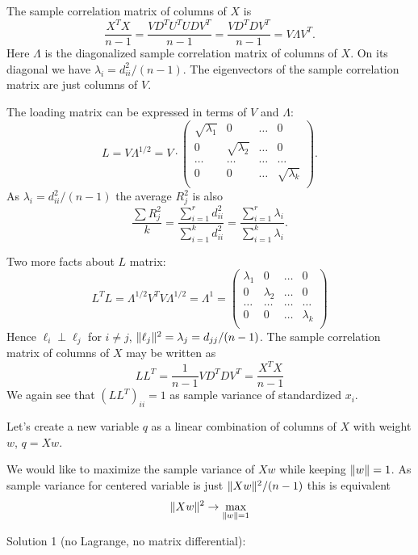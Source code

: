 \documentclass[12pt]{article}
\DeclarePairedDelimiter{\norm}{\lVert}{\rVert}
\begin{document}
The sample correlation matrix of columns of $X$ is
\[
\frac{X^T X}{n-1} = \frac{V D^T U^T UDV^T}{n - 1} = \frac{V D^T D V^T}{ n - 1} = V \Lambda V^T.
\]
Here $\Lambda$ is the diagonalized sample correlation matrix of columns of $X$.
On its diagonal we have $\lambda_i = d_{ii}^2 / (n - 1)$.
The eigenvectors of the sample correlation matrix are just columns of $V$. 

The loading matrix can be expressed in terms of $V$ and $\Lambda$:
\[
L = V \Lambda^{1/2} = V \cdot \begin{pmatrix}
    \sqrt{\lambda_1 } & 0 & \dots & 0 \\
    0  & \sqrt{\lambda_2} & \dots & 0 \\
    \dots & \dots & \dots & \dots \\
    0 & 0 & \dots & \sqrt{\lambda_k} \\
\end{pmatrix}.
\]
As $\lambda_i = d_{ii}^2 / (n-1)$ the average $R^2_j$ is also 
\[
\frac{\sum R_j^2}{k} =  \frac{\sum_{i=1}^r d_{ii}^2}{\sum_{i=1}^k d_{ii}^2} =  \frac{\sum_{i=1}^r \lambda_i}{\sum_{i=1}^k \lambda_i} .
\]

Two more facts about $L$ matrix:
\[
L^T L = \Lambda^{1/2} V^T V \Lambda^{1/2} = \Lambda^1 =  \begin{pmatrix}
    \lambda_1 & 0 & \dots & 0 \\
    0  & \lambda_2 & \dots & 0 \\
    \dots & \dots & \dots & \dots \\
    0 & 0 & \dots & \lambda_k \\
\end{pmatrix}
\]
Hence $\ell_i \perp \ell_j$ for $i \neq j$, $\norm{\ell_j}^2= \lambda_j = d_{jj} / (n - 1)$.
The sample correlation matrix of columns of $X$ may be written as
\[
LL^T = \frac{1}{n-1}V D^T D V^T = \frac{X^TX}{n - 1}
\]
We again see that $(LL^T)_{ii} = 1$ as sample variance of standardized $x_i$.

Let's create a new variable $q$ as a linear combination of columns of $X$ with weight $w$, $q = Xw$.

We would like to maximize the sample variance of $Xw$ while keeping $\norm{w} = 1$.
As sample variance for centered variable is just $\norm{Xw}^2 / (n - 1)$
this is equivalent
\[
\norm{Xw}^2  \to \max_{\norm{w} = 1}
\]

Solution 1 (no Lagrange, no matrix differential):
\end{document}
